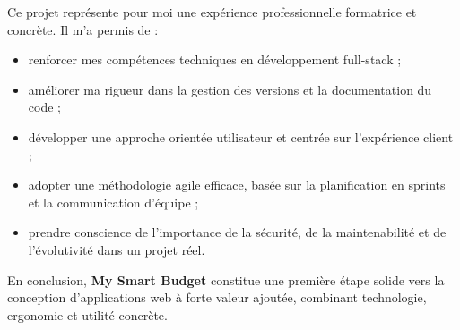 \begin{tcolorbox}[colback=yellow!5!white,colframe=yellow!60!black,title=\textbf{Bilan personnel}]
Ce projet représente pour moi une expérience professionnelle formatrice et concrète.  
Il m’a permis de :
\begin{itemize}
    \item renforcer mes compétences techniques en développement full-stack ;
    \item améliorer ma rigueur dans la gestion des versions et la documentation du code ;
    \item développer une approche orientée utilisateur et centrée sur l’expérience client ;
    \item adopter une méthodologie agile efficace, basée sur la planification en sprints et la communication d’équipe ;
    \item prendre conscience de l’importance de la sécurité, de la maintenabilité et de l’évolutivité dans un projet réel.
\end{itemize}

En conclusion, \textbf{My Smart Budget} constitue une première étape solide vers la conception d’applications web à forte valeur ajoutée, combinant technologie, ergonomie et utilité concrète.
\end{tcolorbox}